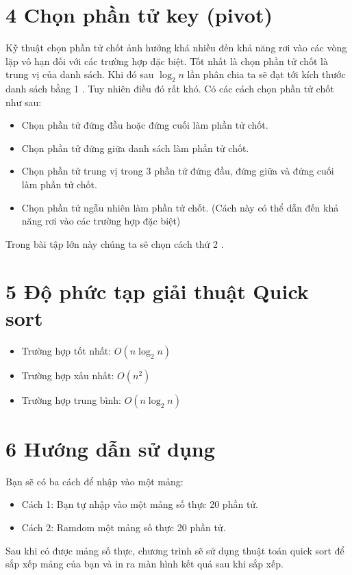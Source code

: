 \documentclass[a4paper]{article}
\begin{document}
\section*{4 Chọn phần tử key (pivot)}
Kỹ thuật chọn phần tử chốt ảnh hưởng khá nhiều đến khả năng rơi vào các vòng lặp vô hạn đối với các trường hợp đặc biệt. Tốt nhất là chọn phần tử chốt là trung vị của danh sách. Khi đó sau $\log _{2} n$ lần phân chia ta sẽ đạt tới kích thước danh sách bằng 1 . Tuy nhiên điều đó rất khó. Có các cách chọn phần tử chốt như sau:

\begin{itemize}
  \item Chọn phần tử đứng đầu hoặc đứng cuối làm phần tử chốt.
  \item Chọn phần tử đứng giữa danh sách làm phần tử chốt.
  \item Chọn phần tử trung vị trong 3 phần tử đứng đầu, đứng giữa và đứng cuối làm phần tử chốt.
  \item Chọn phần tử ngẫu nhiên làm phần tử chốt. (Cách này có thể dẫn đến khả năng rơi vào các trường hợp đặc biệt)
\end{itemize}

Trong bài tập lớn này chúng ta sẽ chọn cách thứ 2 .

\section*{5 Độ phức tạp giải thuật Quick sort}
\begin{itemize}
  \item Trường hợp tốt nhất: $O\left(n \log _{2} n\right)$
  \item Trường hợp xấu nhất: $O\left(n^{2}\right)$
  \item Trường hợp trung bình: $O\left(n \log _{2} n\right)$
\end{itemize}

\section*{6 Hướng dẫn sử dụng}
Bạn sẽ có ba cách để nhập vào một mảng:

\begin{itemize}
  \item Cách 1: Bạn tự nhập vào một mảng số thực 20 phần tử.
  \item Cách 2: Ramdom một mảng số thực 20 phần tử.
\end{itemize}

Sau khi có được mảng số thực, chương trình sẽ sử dụng thuật toán quick sort để sắp xếp mảng của bạn và in ra màn hình kết quả sau khi sắp xếp.
\end{document}
